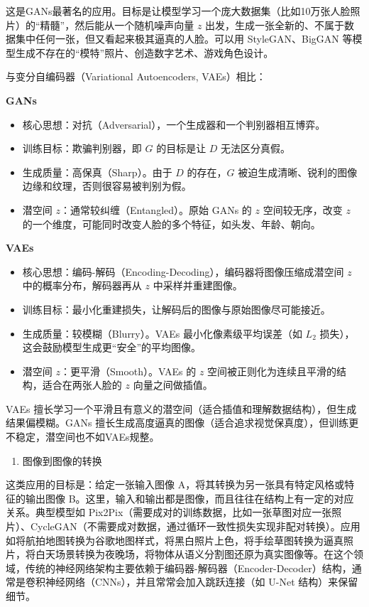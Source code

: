 这是GANs最著名的应用。目标是让模型学习一个庞大数据集（比如10万张人脸照片）的``精髓''，然后能从一个随机噪声向量 \(z\) 出发，生成一张全新的、不属于数据集中任何一张，但又看起来极其逼真的人脸。可以用 StyleGAN、BigGAN 等模型生成不存在的``模特''照片、创造数字艺术、游戏角色设计。

与变分自编码器（Variational Autoencoders, VAEs）相比：

\textbf{GANs}

\begin{itemize}
\tightlist
\item
  核心思想：对抗（Adversarial），一个生成器和一个判别器相互博弈。
\item
  训练目标：欺骗判别器，即 \(G\) 的目标是让 \(D\) 无法区分真假。
\item
  生成质量：高保真（Sharp）。由于 \(D\) 的存在，\(G\) 被迫生成清晰、锐利的图像边缘和纹理，否则很容易被判别为假。
\item
  潜空间 \(z\)：通常较纠缠（Entangled）。原始 GANs 的 \(z\) 空间较无序，改变 \(z\) 的一个维度，可能同时改变人脸的多个特征，如头发、年龄、朝向。
\end{itemize}

\textbf{VAEs}

\begin{itemize}
\tightlist
\item
  核心思想：编码-解码（Encoding-Decoding），编码器将图像压缩成潜空间 \(z\) 中的概率分布，解码器再从 \(z\) 中采样并重建图像。
\item
  训练目标：最小化重建损失，让解码后的图像与原始图像尽可能接近。
\item
  生成质量：较模糊（Blurry）。VAEs 最小化像素级平均误差（如 \(L_2\) 损失），这会鼓励模型生成更``安全''的平均图像。
\item
  潜空间 \(z\)：更平滑（Smooth）。VAEs 的 \(z\) 空间被正则化为连续且平滑的结构，适合在两张人脸的 \(z\) 向量之间做插值。
\end{itemize}

VAEs 擅长学习一个平滑且有意义的潜空间（适合插值和理解数据结构），但生成结果偏模糊。GANs 擅长生成高度逼真的图像（适合追求视觉保真度），但训练更不稳定，潜空间也不如VAEs规整。

\begin{enumerate}
\def\labelenumi{\arabic{enumi}.}
\setcounter{enumi}{1}
\tightlist
\item
  图像到图像的转换
\end{enumerate}

这类应用的目标是：给定一张输入图像 A，将其转换为另一张具有特定风格或特征的输出图像 B。这里，输入和输出都是图像，而且往往在结构上有一定的对应关系。典型模型如 Pix2Pix（需要成对的训练数据，比如一张草图对应一张照片）、CycleGAN（不需要成对数据，通过循环一致性损失实现非配对转换）。应用如将航拍地图转换为谷歌地图样式，将黑白照片上色，将手绘草图转换为逼真照片，将白天场景转换为夜晚场，将物体从语义分割图还原为真实图像等。在这个领域，传统的神经网络架构主要依赖于编码器-解码器（Encoder-Decoder）结构，通常是卷积神经网络（CNNs），并且常常会加入跳跃连接（如 U-Net 结构）来保留细节。

